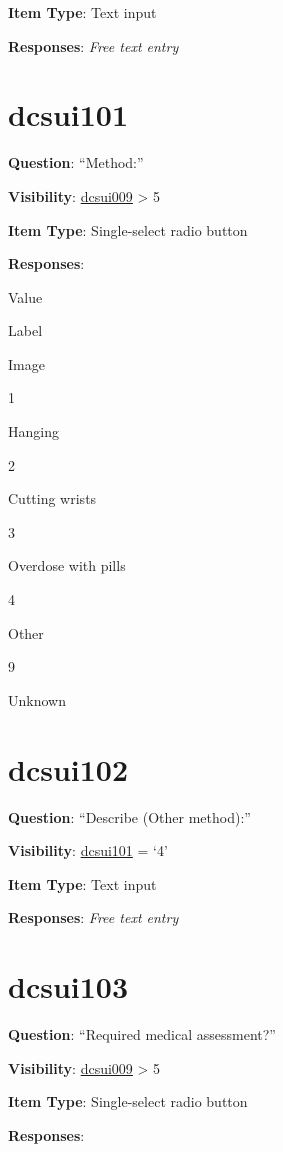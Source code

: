 \documentclass[]{book}
\begin{document}
\textbf{Item Type}: Text input

\textbf{Responses}: \emph{Free text entry}

\hypertarget{dcsui101}{%
\section{dcsui101}\label{dcsui101}}

\textbf{Question}: ``Method:''

\textbf{Visibility}: \protect\hyperlink{dcsui009}{dcsui009} \textgreater{} 5

\textbf{Item Type}: Single-select radio button

\textbf{Responses}:

Value

Label

Image

1

Hanging

2

Cutting wrists

3

Overdose with pills

4

Other

9

Unknown

\hypertarget{dcsui102}{%
\section{dcsui102}\label{dcsui102}}

\textbf{Question}: ``Describe (Other method):''

\textbf{Visibility}: \protect\hyperlink{dcsui101}{dcsui101} = `4'

\textbf{Item Type}: Text input

\textbf{Responses}: \emph{Free text entry}

\hypertarget{dcsui103}{%
\section{dcsui103}\label{dcsui103}}

\textbf{Question}: ``Required medical assessment?''

\textbf{Visibility}: \protect\hyperlink{dcsui009}{dcsui009} \textgreater{} 5

\textbf{Item Type}: Single-select radio button

\textbf{Responses}:
\end{document}
